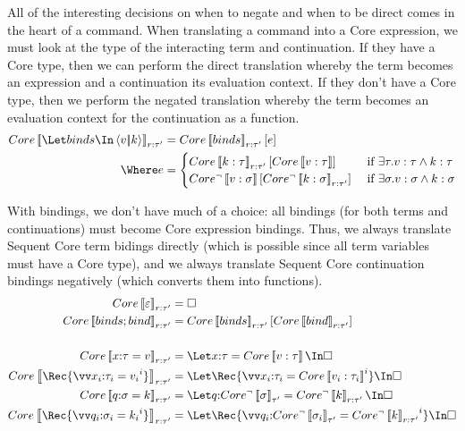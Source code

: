 \documentclass{article}
\begin{document}
All of the interesting decisions on when to negate and when to be direct comes
in the heart of a command.  When translating a command into a Core expression,
we must look at the type of the interacting term and continuation.  If they have
a Core type, then we can perform the direct translation whereby the term becomes
an expression and a continuation its evaluation context.  If they don't have a
Core type, then we perform the negated translation whereby the term becomes an
evaluation context for the continuation as a function.
\begin{align*}
  Core\trans{\Let \binds \In \cut{\tm}{\ko}}_{\ann{r}{\ty'}}
  &= Core\trans{\binds}_{\ann{r}{\ty'}}[\expr]
  \\
  \Where
  e
  &=
  \begin{cases}
    Core\trans{\ko : \ty}_{\ann{r}{\ty'}}[Core\trans{\tm : \ty}]
    & \text{ if } \exists \ty. \tm : \ty \wedge \ko : \ty
    \\
    Core^\neg\trans{\tm : \sty}[Core^\neg\trans{\ko : \sty}_{\ann{r}{\ty'}}]
    & \text{ if } \exists \sty. \tm : \sty \wedge \ko : \sty
  \end{cases}
\end{align*}

With bindings, we don't have much of a choice: all bindings (for both terms and
continuations) must become Core expression bindings.  Thus, we always translate
Sequent Core term bidings directly (which is possible since all term variables
must have a Core type), and we always translate Sequent Core continuation
bindings negatively (which converts them into functions).
\begin{align*}
  Core\trans{\mt}_{\ann{r}{\ty'}} &= \hole
  \\
  Core\trans{\binds; \abind}_{\ann{r}{\ty'}}
  &=
  Core\trans{\binds}_{\ann{r}{\ty'}}[Core\trans{\abind}_{\ann{r}{\ty'}}]
  \\\\
  Core\trans{\ann x \ty = \tm}_{\ann{r}{\ty'}}
  &=
  \Let \ann x \ty = Core\trans{\tm : \ty} \In \hole
  \\
  Core\trans{\Rec \{ \vect[i]{\ann{x_i}{\ty_i} = \tm_i} \}}_{\ann{r}{\ty'}}
  &=
  \Let
    \Rec \{ \vect[i]{\ann{x_i}{\ty_i} = Core\trans{\tm_i : \ty_i}} \}
  \In
    \hole
  \\
  Core\trans{\ann q \sty = \ko}_{\ann{r}{\ty'}}
  &=
  \Let \ann{q}{Core^\neg\trans{\sty}_{\ty'}} = Core^\neg\trans{\ko}_{\ann{r}{\ty'}} \In \hole
  \\
  Core\trans{\Rec \{ \vect[i]{\ann{q_i}{\sty_i} = \ko_i} \}}_{\ann{r}{\ty'}}
  &=
  \Let
    \Rec \{
      \vect[i]{\ann{q_i}{Core^\neg\trans{\sty_i}_{\ty'}}
      =
      Core^\neg\trans{\ko}_{\ann{r}{\ty'}}}
    \}
  \In
    \hole
\end{align*}
\end{document}
